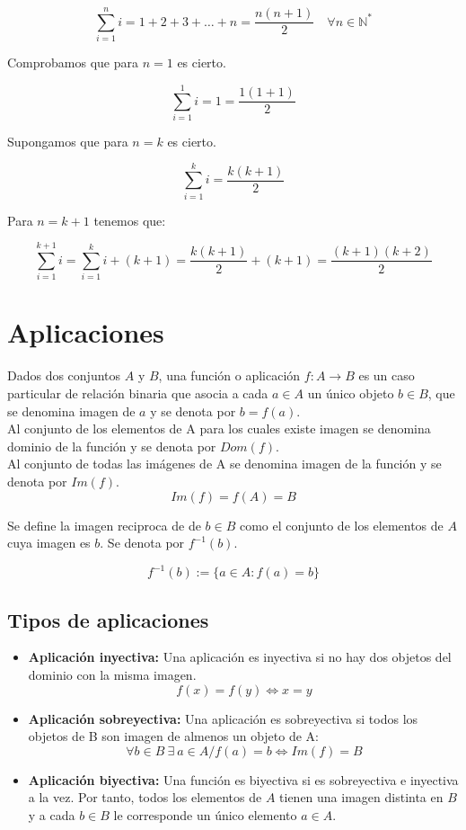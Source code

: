 \documentclass[0_algebra.tex]{subfiles}
\begin{document}
$$
\sum_{i=1}^n i= 1+2+3+\dots+n= \frac{n(n+1)}{2} \quad \forall n \in \mathbb{N}^*
$$

Comprobamos que para $n=1$ es cierto.

$$
\sum_{i=1}^1 i= 1 =\frac{1(1+1)}{2}
$$

Supongamos que para $n=k$ es cierto.

$$
\sum_{i=1}^k i= \frac{k(k+1)}{2}
$$

Para $n=k+1$ tenemos que:

$$
\sum_{i=1}^{k+1} i= \sum_{i=1}^k i + (k+1) = \frac{k(k+1)}{2} + (k+1) =\frac{(k+1)(k+2)}{2}
$$

\section{Aplicaciones}
Dados dos conjuntos $A$ y $B$, una función o aplicación $f:A\rightarrow B$ es un caso particular de relación binaria que asocia a cada  $a\in A$ un único objeto $b\in B$, que se denomina imagen de $a$ y se denota por $b=f(a)$.\\

Al conjunto de los elementos de A para los cuales existe imagen se denomina dominio de la función y se denota por $Dom(f)$.\\

Al conjunto de todas las imágenes de A se denomina imagen de la función y se denota por $Im(f)$.
$$
Im(f)=f(A)=B
$$

Se define la imagen reciproca de de $b\in B$ como el conjunto de los elementos de $A$ cuya imagen es $b$. Se denota por $f^{-1}(b)$.

$$
f^{-1}(b):=\lbrace a \in A : f(a) = b \rbrace
$$

\subsection*{Tipos de aplicaciones}
\begin{itemize}
\item \textbf{Aplicación inyectiva: }Una aplicación es inyectiva si no hay dos objetos del dominio con la misma imagen.
$$
f(x)=f(y)\Longleftrightarrow x=y
$$
\item \textbf{Aplicación sobreyectiva: }Una aplicación es sobreyectiva si todos los objetos de B son imagen de almenos un objeto de A:
$$
\forall b\in B \ \exists \ a\in A / f(a)=b \Longleftrightarrow Im(f)=B
$$
\item \textbf{Aplicación biyectiva:} Una función es biyectiva si es sobreyectiva e inyectiva a la vez. Por tanto, todos los elementos de $A$ tienen una imagen distinta en $B$ y a cada $b\in B$ le corresponde un único elemento $a \in A$.
\end{itemize}
\end{document}
